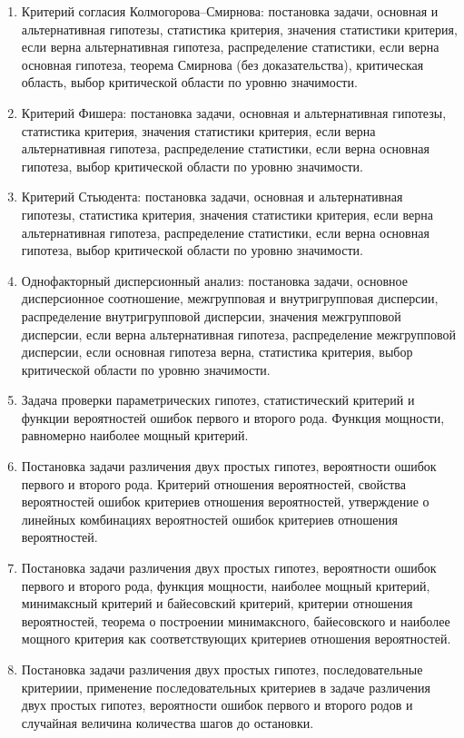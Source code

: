 \documentclass[a4paper,12pt]{article}
\begin{document}
\begin{enumerate}[resume]
    \item \label{hyp:KS} Критерий согласия Колмогорова--Смирнова: постановка задачи, основная и альтернативная гипотезы, статистика критерия, значения статистики критерия, если верна альтернативная гипотеза, распределение статистики, если верна основная гипотеза, теорема Смирнова (без доказательства), критическая область, выбор критической области по уровню значимости.
    \item \label{hyp:F} Критерий Фишера: постановка задачи, основная и альтернативная гипотезы, статистика критерия, значения статистики критерия, если верна альтернативная гипотеза, распределение статистики, если верна основная гипотеза, выбор критической области по уровню значимости.
    \item \label{hyp:S} Критерий Стьюдента: постановка задачи, основная и альтернативная гипотезы, статистика критерия, значения статистики критерия, если верна альтернативная гипотеза, распределение статистики, если верна основная гипотеза, выбор критической области по уровню значимости.
    \item \label{hyp:fa} Однофакторный дисперсионный анализ: постановка задачи, основное дисперсионное соотношение, межгрупповая и внутригрупповая дисперсии, распределение внутригрупповой дисперсии, значения межгрупповой дисперсии, если верна альтернативная гипотеза, распределение межгрупповой дисперсии, если основная гипотеза верна, статистика критерия, выбор критической области по уровню значимости.
    \item \label{hyp:par} Задача проверки параметрических гипотез, статистический критерий и функции вероятностей ошибок первого и второго рода. Функция мощности, равномерно наиболее мощный критерий.
    \item \label{hyp:dis-fn-pr} Постановка задачи различения двух простых гипотез, вероятности ошибок первого и второго рода. Критерий отношения вероятностей, свойства вероятностей ошибок критериев отношения вероятностей, утверждение о линейных комбинациях вероятностей ошибок критериев отношения вероятностей.
    \item \label{hyp:dis-fn-cr} Постановка задачи различения двух простых гипотез, вероятности ошибок первого и второго рода, функция мощности, наиболее мощный критерий, минимаксный критерий и байесовский критерий, критерии отношения вероятностей, теорема о построении минимаксного, байесовского и наиболее мощного критерия как соответствующих критериев отношения вероятностей.
    \item \label{hyp:dis-inf} Постановка задачи различения двух простых гипотез, последовательные критериии, применение последовательных критериев в задаче различения двух простых гипотез, вероятности ошибок первого и второго родов и случайная величина количества шагов до остановки.

\end{enumerate}
\end{document}
